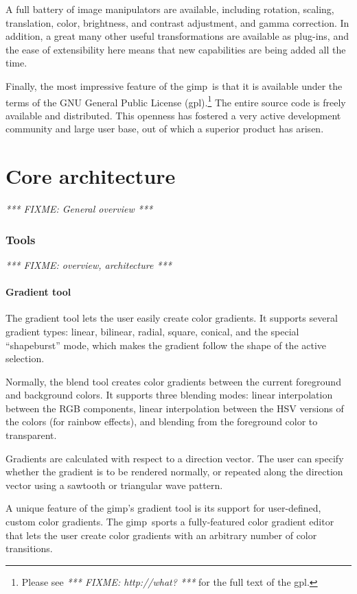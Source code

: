 \documentclass[12pt]{article}
\def\gimp{{\sc gimp}}
\def\gpl{{\sc gpl}}
\newcommand{\FIXME}[1]{\emph{*** FIXME: #1 ***}}
\begin{document}
A full battery of image manipulators are available, including
rotation, scaling, translation, color, brightness, and contrast
adjustment, and gamma correction.  In addition, a great many other
useful transformations are available as plug-ins, and the ease of
extensibility here means that new capabilities are being added all the
time.

Finally, the most impressive feature of the \gimp\ is that it is
available under the terms of the GNU General Public License
(\gpl).\footnote{Please see \FIXME{http://what?} for the full text of
the \gpl.}  The entire source code is freely available and
distributed.  This openness has fostered a very active development
community and large user base, out of which a superior product has
arisen.

\part{Core architecture}

\FIXME{General overview}

\section{Tools}

\FIXME{overview, architecture}

\subsection{Gradient tool}

The gradient tool lets the user easily create color gradients.  It
supports several gradient types: linear, bilinear, radial, square,
conical, and the special ``shapeburst'' mode, which makes the gradient
follow the shape of the active selection.

Normally, the blend tool creates color gradients between the current
foreground and background colors.  It supports three blending modes:
linear interpolation between the RGB components, linear interpolation
between the HSV versions of the colors (for rainbow effects), and
blending from the foreground color to transparent.

Gradients are calculated with respect to a direction vector.  The user
can specify whether the gradient is to be rendered normally, or
repeated along the direction vector using a sawtooth or triangular
wave pattern.

A unique feature of the \gimp's gradient tool is its support for
user-defined, custom color gradients.  The \gimp\ sports a
fully-featured color gradient editor that lets the user create color
gradients with an arbitrary number of color transitions.
\end{document}
